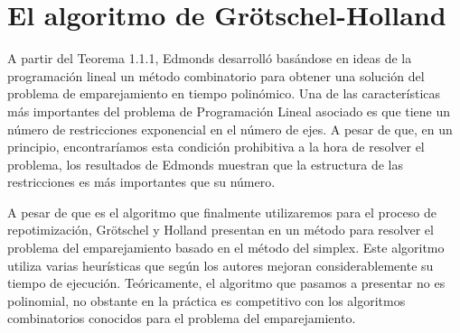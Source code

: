 \documentclass[twoside,a4paper,openright,12pt,tikz]{book}
\begin{document}
\section{El algoritmo de Grötschel-Holland}
A partir del Teorema 1.1.1, Edmonds desarrolló basándose en ideas de la programación lineal un método combinatorio \cite{edmond} para obtener una solución del problema de emparejamiento en tiempo polinómico. Una de las características más importantes del problema de Programación Lineal asociado es que tiene un número de restricciones exponencial en el número de ejes. A pesar de que, en un principio, encontraríamos esta condición prohibitiva a la hora de resolver el problema, los resultados de Edmonds muestran que la estructura de las restricciones es más importantes que su número. 

A pesar de que es el algoritmo que finalmente utilizaremos para el proceso de repotimización, Grötschel y Holland presentan en \cite{holland} un método para resolver el problema del emparejamiento basado en el método del simplex. Este algoritmo utiliza varias heurísticas que según los autores mejoran considerablemente su tiempo de ejecución. Teóricamente, el algoritmo que pasamos a presentar no es polinomial, no obstante en la práctica es competitivo con los algoritmos combinatorios conocidos para el problema del emparejamiento.
\end{document}
